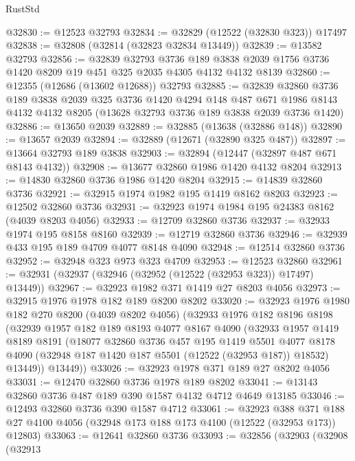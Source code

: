 \begin{lexlean}{RustStd}
\begin{coremodule}
@32830 := @12523 @32793
@32834 := @32829 (@12522 (@32830 @323)) @17497
@32838 := @32808 (@32814 (@32823 @32834 @13449))
@32839 := @13582 @32793
@32856 := @32839
    @32793
    @3736
    @189
    @3838
    @2039
    @1756
    @3736
    @1420
    @8209
    @19
    @451
    @325
    @2035
    @4305
    @4132
    @4132
    @8139
@32860 := @12355 (@12686 (@13602 @12688)) @32793
@32885 := @32839
    @32860
    @3736
    @189
    @3838
    @2039
    @325
    @3736
    @1420
    @4294
    @148
    @487
    @671
    @1986
    @8143
    @4132
    @4132
    @8205
    (@13628 @32793 @3736 @189 @3838 @2039 @3736 @1420)
@32886 := @13650 @2039
@32889 := @32885 (@13638 (@32886 @148))
@32890 := @13657 @2039
@32894 := @32889 (@12671 (@32890 @325 @487))
@32897 := @13664 @32793 @189 @3838
@32903 := @32894 (@12447 (@32897 @487 @671 @8143 @4132))
@32908 := @13677 @32860 @1986 @1420 @4132 @8204
@32913 := @14830 @32860 @3736 @1986 @1420 @8204
@32915 := @14839 @32860 @3736
@32921 := @32915 @1974 @1982 @195 @1419 @8162 @8203
@32923 := @12502 @32860 @3736
@32931 := @32923 @1974 @1984 @195 @24383 @8162 (@4039 @8203 @4056)
@32933 := @12709 @32860 @3736
@32937 := @32933 @1974 @195 @8158 @8160
@32939 := @12719 @32860 @3736
@32946 := @32939 @433 @195 @189 @4709 @4077 @8148 @4090
@32948 := @12514 @32860 @3736
@32952 := @32948 @323 @973 @323 @4709
@32953 := @12523 @32860
@32961 := @32931 (@32937 (@32946 (@32952 (@12522 (@32953 @323)) @17497) @13449))
@32967 := @32923 @1982 @371 @1419 @27 @8203 @4056
@32973 := @32915 @1976 @1978 @182 @189 @8200 @8202
@33020 := @32923
    @1976
    @1980
    @182
    @270
    @8200
    (@4039 @8202 @4056)
    (@32933
      @1976
      @182
      @8196
      @8198
      (@32939
        @1957
        @182
        @189
        @8193
        @4077
        @8167
        @4090
        (@32933
          @1957
          @1419
          @8189
          @8191
          (@18077
            @32860
            @3736
            @457
            @195
            @1419
            @5501
            @4077
            @8178
            @4090
            (@32948 @187 @1420 @187 @5501 (@12522 (@32953 @187)) @18532)
            @13449))
        @13449))
@33026 := @32923 @1978 @371 @189 @27 @8202 @4056
@33031 := @12470 @32860 @3736 @1978 @189 @8202
@33041 := @13143 @32860 @3736 @487 @189 @390 @1587 @4132 @4712 @4649 @13185
@33046 := @12493 @32860 @3736 @390 @1587 @4712
@33061 := @32923
    @388
    @371
    @188
    @27
    @4100
    @4056
    (@32948 @173 @188 @173 @4100 (@12522 (@32953 @173)) @12803)
@33063 := @12641 @32860 @3736
@33093 := @32856
    (@32903
      (@32908
        (@32913

\end{coremodule}
\end{lexlean}
